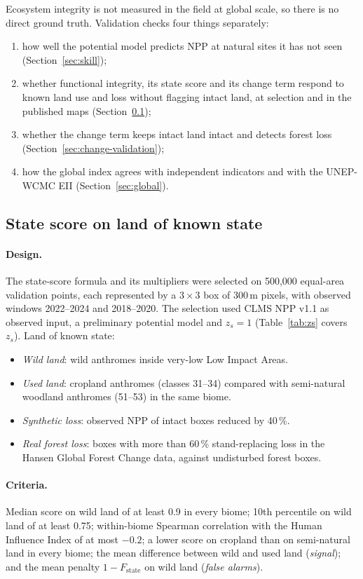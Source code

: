 \documentclass[11pt,a4paper]{article}
\begin{document}
Ecosystem integrity is not measured in the field at global scale, so there is no direct ground
truth. Validation checks four things separately:
\begin{enumerate}
\item how well the potential model predicts NPP at natural sites it has not seen
(Section~\ref{sec:skill});
\item whether functional integrity, its state score and its change term respond to known land
use and loss without flagging intact land, at selection and in the published maps
(Section~\ref{sec:fi-selection});
\item whether the change term keeps intact land intact and detects forest loss
(Section~\ref{sec:change-validation});
\item how the global index agrees with independent indicators and with the UNEP-WCMC EII
(Section~\ref{sec:global}).
\end{enumerate}

\subsection{State score on land of known state}
\label{sec:fi-selection}

\paragraph{Design.} The state-score formula and its multipliers were selected on 500,000
equal-area validation points, each represented by a $3 \times 3$ box of 300\,m pixels, with
observed windows 2022--2024 and 2018--2020. The selection used CLMS NPP v1.1 as observed input, a
preliminary potential model and $z_s = 1$ (Table~\ref{tab:zs} covers $z_s$). Land of known state:
\begin{itemize}
\item \emph{Wild land}: wild anthromes inside very-low Low Impact Areas.
\item \emph{Used land}: cropland anthromes (classes 31--34) compared with semi-natural woodland
anthromes (51--53) in the same biome.
\item \emph{Synthetic loss}: observed NPP of intact boxes reduced by 40\,\%.
\item \emph{Real forest loss}: boxes with more than 60\,\% stand-replacing loss in the Hansen
Global Forest Change data, against undisturbed forest boxes.
\end{itemize}

\paragraph{Criteria.} Median score on wild land of at least 0.9 in every biome; 10th percentile
on wild land of at least 0.75; within-biome Spearman correlation with the Human Influence Index
of at most $-0.2$; a lower score on cropland than on semi-natural land in every biome; the mean
difference between wild and used land (\emph{signal}); and the mean penalty $1 - F_{\text{state}}$
on wild land (\emph{false alarms}).
\end{document}
